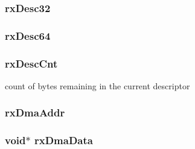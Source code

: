 \label{classNSGigE_a6cc267606cd392ef073394a9464c9c19}
\hypertarget{classNSGigE_a9c135674cce636c948f5ac5e732d1b2e}{
\subsubsection[{rxDesc32}]{ {\bf rxDesc32}}}
\label{classNSGigE_a9c135674cce636c948f5ac5e732d1b2e}
\hypertarget{classNSGigE_a52b2326750d18fc4df6f4f55103f6d25}{
\subsubsection[{rxDesc64}]{ {\bf rxDesc64}}}
\label{classNSGigE_a52b2326750d18fc4df6f4f55103f6d25}
\hypertarget{classNSGigE_a9000aa81b1111f932e134850b5980497}{
\subsubsection[{rxDescCnt}]{ {\bf rxDescCnt}}}
\label{classNSGigE_a9000aa81b1111f932e134850b5980497}
count of bytes remaining in the current descriptor \hypertarget{classNSGigE_a4a609f84c6849bcfb6dee08329773fca}{
\subsubsection[{rxDmaAddr}]{ {\bf rxDmaAddr}}}
\label{classNSGigE_a4a609f84c6849bcfb6dee08329773fca}
\hypertarget{classNSGigE_ad2ec4911ac2ba9d13946d044e0a7ec11}{
\subsubsection[{rxDmaData}]{\setlength{\rightskip}{0pt plus 5cm}void$\ast$ {\bf rxDmaData}}}
